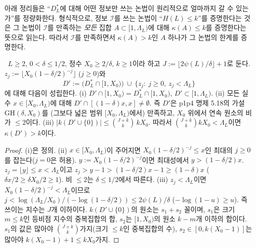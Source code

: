 아래 정리들은 ``$D^*_L$에 대해 어떤 정보만 쓰는 논법이 원리적으로 얼마까지 갈 수 있는가''를 정량화한다. 형식적으로, 정보 $\mathcal I$를 쓰는 논법이 ``$H(L)\le k$''를 증명한다는 것은 그 논법이 $\mathcal I$를 만족하는 \emph{모든} 집합 $A\subset[1,\Lambda_L)$에 대해 $\kappa(A)\le k$를 증명한다는 뜻으로 읽는다. 따라서 $\mathcal I$를 만족하면서 $\kappa(A)>k$인 $A$ 하나가 그 논법의 한계를 증명한다.

\begin{theorem}[간격 가설 정보의 장벽]\label{CORE:thm-GH-barrier}
\PROVED\ $L\ge2$, $0<\delta\le1/2$, 정수 $X_0\ge2/\delta$, $k\ge1$이라 하고 $J:=\lfloor2\psi(L)/\delta\rfloor+1$로 둔다.
$z_j:=\lfloor X_0(1-\delta/2)^{-j}\rfloor$ ($j\ge0$)와
\[
D':=\bigl(D^*_L\cap[1,X_0)\bigr)\ \cup\ \{z_j:\ j\ge0,\ z_j<\Lambda_L\}
\]
에 대해 다음이 성립한다.
(i) $D'\cap[1,X_0)=D^*_L\cap[1,X_0)$, $D'\subset[1,\Lambda_L)$.
(ii) 모든 실수 $x\in[X_0,\Lambda_L)$에 대해 $D'\cap[(1-\delta)x,x]\ne\emptyset$. 즉 $D'$은 p1p4 명제 5.18의 가설 $\mathrm{GH}(\delta,X_0)$를 (그보다 넓은 범위 $[X_0,\Lambda_L)$에서) 만족하고, $X_0$ 위에서 연속 원소의 비가 $\le2$이다.
(iii) $|k(D'\cup\{0\})|\le\binom{J+k}{k}\,kX_0$.
따라서 $\binom{J+k}{k}kX_0<\Lambda_L$이면 $\kappa(D')>k$이다.
\end{theorem}
\begin{proof}
(i)은 정의. (ii) $x\in[X_0,\Lambda_L)$이 주어지면 $X_0(1-\delta/2)^{-j}\le x$인 최대의 $j\ge0$를 잡는다($j=0$은 허용). $y:=X_0(1-\delta/2)^{-j}$이면 최대성에서 $y>(1-\delta/2)x$. $z_j=\lfloor y\rfloor\le x<\Lambda_L$이고 $z_j>y-1>(1-\delta/2)x-1\ge(1-\delta)x$ ($\delta x/2\ge\delta X_0/2\ge1$). 비 $\le2$는 $\delta\le1/2$에서 따른다.
(iii) $z_j<\Lambda_L$이면 $X_0(1-\delta/2)^{-j}<\Lambda_L$이므로 $j<\log(\Lambda_L/X_0)/(-\log(1-\delta/2))\le2\psi(L)/\delta$ ($-\log(1-u)\ge u$). 즉 쓰이는 지수는 $J$개 이하이다. $k(D'\cup\{0\})$의 원소는 $s_1+s_2$ 꼴이며, $s_1$은 크기 $m\le k$인 등비점 지수의 중복집합의 합, $s_2$는 $[1,X_0)$의 원소 $k-m$개 이하의 합이다. $s_1$의 값은 많아야 $\binom{J+k}{k}$가지(크기 $\le k$인 중복집합의 수), $s_2\in[0,k(X_0-1)]$는 많아야 $k(X_0-1)+1\le kX_0$가지.
\end{proof}

